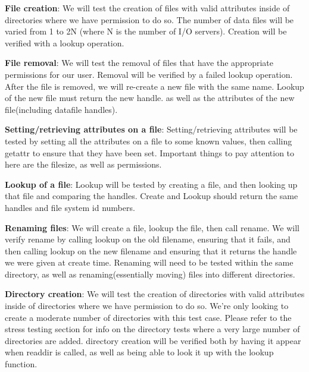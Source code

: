 \documentclass[12pt]{article} %
\begin{document}
\begin{list}{.}{}

\item \textbf{File creation}:  We will test the creation of files with valid attributes inside of directories where we have permission to do so.  The number of data files will be varied from 1 to 2N (where N is the number of I/O servers).  Creation will be verified with a lookup operation.

\item \textbf{File removal}:  We will test the removal of files that have the appropriate permissions for our user.  Removal will be verified by a failed lookup operation.  After the file is removed, we will re-create a new file with the same name.  Lookup of the new file must return the new handle. as well as the attributes of the new file(including datafile handles).

\item \textbf{Setting/retrieving attributes on a file}:  Setting/retrieving attributes will be tested by setting all the attributes on a file to some known values, then calling getattr to ensure that they have been set.  Important things to pay attention to here are the filesize, as well as permissions.

\item \textbf{Lookup of a file}:  Lookup will be tested by creating a file, and then looking up that file and comparing the handles.  Create and Lookup should return the same handles and file system id numbers.

\item \textbf{Renaming files}:  We will create a file, lookup the file, then call rename.  We will verify rename by calling lookup on the old filename, ensuring that it fails, and then calling lookup on the new filename and ensuring that it returns the handle we were given at create time.  Renaming will need to be tested within the same directory, as well as renaming(essentially moving) files into different directories.

\item \textbf{Directory creation}:  We will test the creation of directories with valid attributes inside of directories where we have permission to do so.  We're only looking to create a moderate number of directories with this test case.  Please refer to the stress testing section for info on the directory tests where a very large number of directories are added.  directory creation will be verified both by having it appear when readdir is called, as well as being able to look it up with the lookup function.


\end{list}
\end{document}
